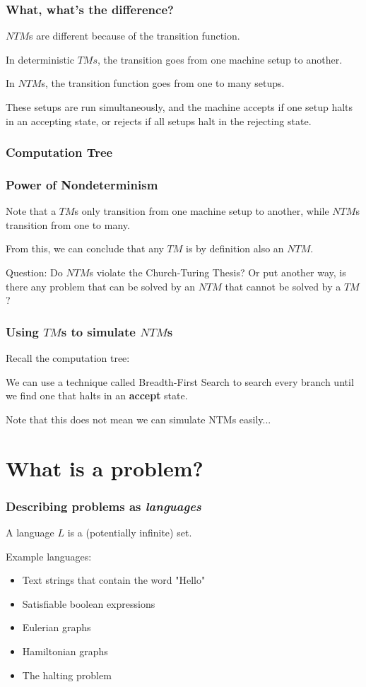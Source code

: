 \documentclass[aspectratio=169]{beamer}
\begin{document}
\begin{frame}
\frametitle{What, what's the difference?}
$NTM$s are different because of the transition function.

In deterministic $TMs$, the transition goes from one machine setup to another.

In $NTM$s, the transition function goes from one to many setups.

These setups are run simultaneously, and the machine accepts if one setup halts in an accepting state, or rejects if all setups halt in the rejecting state.
\end{frame}

\begin{frame}
\frametitle{Computation Tree}

\end{frame}

\begin{frame}
\frametitle{Power of Nondeterminism}
Note that a $TM$s only transition from one machine setup to another, while $NTM$s transition from one to many.

From this, we can conclude that any $TM$ is by definition also an $NTM$.

Question: Do $NTM$s violate the Church-Turing Thesis? Or put another way, is there any problem that can be solved by an $NTM$ that cannot be solved by a $TM$?
\end{frame}

\begin{frame}
\frametitle{Using $TM$s to simulate $NTM$s}
Recall the computation tree:

We can use a technique called Breadth-First Search to search every branch until we find one that halts in an {\bf accept} state.

Note that this does not mean we can simulate NTMs easily...
\end{frame}

\section{What is a problem?}

\begin{frame}
\frametitle{Describing problems as {\em languages}}
A language $L$ is a (potentially infinite) set.

Example languages:
\begin{itemize}
	\item Text strings that contain the word "Hello"
	\item Satisfiable boolean expressions
	\item Eulerian graphs
	\item Hamiltonian graphs
	\item The halting problem
\end{itemize}
\end{frame}
\end{document}
